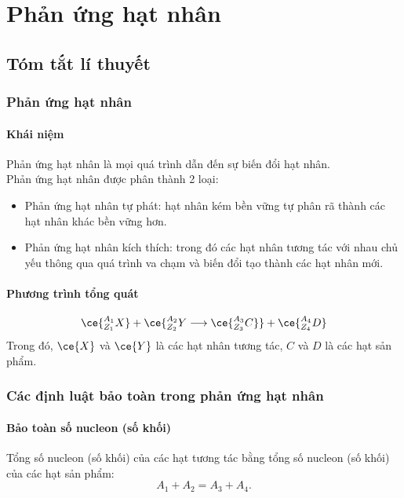 \section{Phản ứng hạt nhân}
\subsection{Tóm tắt lí thuyết}
\begin{tomtat}
	\subsubsection{Phản ứng hạt nhân}
	\paragraph{Khái niệm}
	\begin{dn}
		Phản ứng hạt nhân là mọi quá trình dẫn đến sự biến đổi hạt nhân.\\
		Phản ứng hạt nhân được phân thành 2 loại:
		\begin{itemize}
			\item Phản ứng hạt nhân tự phát: hạt nhân kém bền vững tự phân rã thành các hạt nhân khác bền vững hơn.
			\item Phản ứng hạt nhân kích thích: trong đó các hạt nhân tương tác với nhau chủ yếu thông qua quá trình va chạm và biến đổi tạo thành các hạt nhân mới.
		\end{itemize}
	\end{dn}
	\paragraph{Phương trình tổng quát}
	\begin{equation}
		\ce{^{A_1}_{Z_1}X}+\ce{^{A_2}_{Z_2}Y\longrightarrow \ce{^{A_3}_{Z_3}C}}+\ce{^{A_4}_{Z_4}D}
	\end{equation}
	Trong đó, $\ce{X}$ và $\ce{Y}$ là các hạt nhân tương tác, $C$ và $D$ là các hạt sản phẩm.
	\subsubsection{Các định luật bảo toàn trong phản ứng hạt nhân}
	\paragraph{Bảo toàn số nucleon (số khối)}
	\begin{boxdl}
		Tổng số nucleon (số khối) của các hạt tương tác bằng tổng số nucleon (số khối) của các hạt sản phẩm:
		\begin{equation}
			A_1+A_2=A_3+A_4.
		\end{equation}
	\end{boxdl}

\end{tomtat}
